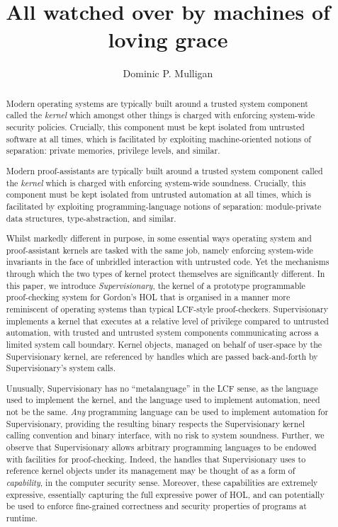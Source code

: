 \documentclass[a4paper, UKenglish, cleveref, autoref, thm-restate, colorlinks]{lipics-v2021}
\title{All watched over by machines of loving grace}
\author{Dominic P. Mulligan}{Automated Reasoning Group, Amazon Web Services, Cambridge, United Kingdom\footnote{All work done whilst employed within the Systems Research Group, Arm Research, Cambridge} \and \url{www.dominic-mulligan.co.uk}}{dominic.p.mulligan@gmail.com}{}{}
\begin{document}
\maketitle

\begin{abstract}
Modern operating systems are typically built around a trusted system component called the \emph{kernel} which amongst other things is charged with enforcing system-wide security policies.
Crucially, this component must be kept isolated from untrusted software at all times, which is facilitated by exploiting machine-oriented notions of separation: private memories, privilege levels, and similar.

Modern proof-assistants are typically built around a trusted system component called the \emph{kernel} which is charged with enforcing system-wide soundness.
Crucially, this component must be kept isolated from untrusted automation at all times, which is facilitated by exploiting programming-language notions of separation: module-private data structures, type-abstraction, and similar.

Whilst markedly different in purpose, in some essential ways operating system and proof-assistant kernels are tasked with the same job, namely enforcing system-wide invariants in the face of unbridled interaction with untrusted code.  Yet the mechanisms through which the two types of kernel protect themselves are significantly different.
In this paper, we introduce \emph{Supervisionary}, the kernel of a prototype programmable proof-checking system for Gordon's HOL that is organised in a manner more reminiscent of operating systems than typical LCF-style proof-checkers.
Supervisionary implements a kernel that executes at a relative level of privilege compared to untrusted automation, with trusted and untrusted system components communicating across a limited system call boundary.
Kernel objects, managed on behalf of user-space by the Supervisionary kernel, are referenced by handles which are passed back-and-forth by Supervisionary's system calls.

Unusually, Supervisionary has no ``metalanguage'' in the LCF sense, as the language used to implement the kernel, and the language used to implement automation, need not be the same.
\emph{Any} programming language can be used to implement automation for Supervisionary, providing the resulting binary respects the Supervisionary kernel calling convention and binary interface, with no risk to system soundness.
Further, we observe that Supervisionary allows arbitrary programming languages to be endowed with facilities for proof-checking.
Indeed, the handles that Supervisionary uses to reference kernel objects under its management may be thought of as a form of \emph{capability}, in the computer security sense.
Moreover, these capabilities are extremely expressive, essentially capturing the full expressive power of HOL, and can potentially be used to enforce fine-grained correctness and security properties of programs at runtime.
\end{abstract}
\end{document}
